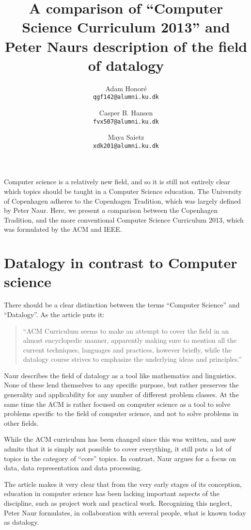 \documentclass[11pt,a4paper]{article}
\title{A comparison of “Computer Science Curriculum 2013” and Peter Naurs description of the field of datalogy}
\author
{
	Adam Honoré\\
	{\tt qgf142@alumni.ku.dk}
	\and
	Casper B. Hansen\\
	{\tt fvx507@alumni.ku.dk}
	\and
	Maya Saietz\\
	{\tt xdk201@alumni.ku.dk}
}
\begin{document}
\maketitle

\noindent Computer science is a relatively new field, and so it is still not entirely clear which topics should be taught in a
Computer Science education. The University of Copenhagen adheres to the Copenhagen Tradition, which was largely defined
by Peter Naur. Here, we present a comparison between the Copenhagen Tradition, and the more conventional Computer
Science Curriculum 2013, which was formulated by the ACM and IEEE.

\section{Datalogy in contrast to Computer science}
There should be a clear distinction between the terms ``Computer Science'' and ``Datalogy''. As the article\cite{froekjaer88} puts it:

\begin{quote}
    ``ACM Curriculum seems to make an attempt to cover the field in an almost encyclopedic manner, apparently making sure to
    mention all the current techniques, languages and practices, however briefly, while the datalogy course strives to
    emphasize the underlying ideas and principles.''
\end{quote}

Naur describes the field of datalogy as a tool like mathematics and linguistics. None of these lend themselves to any
specific purpose, but rather preserves the generality and applicability for any number of different problem classes. At
the same time the ACM is rather focused on computer science as a tool to solve problems specific to the field of
computer science, and not to solve problems in other fields.

While the ACM curriculum has been changed since this was written, and now admits that it is simply not possible to cover
everything, it still puts a lot of topics in the category of ``core'' topics. In contrast, Naur argues for a focus on
data, data representation and data processing\cite{naur66}.

The article\cite{froekjaer88} makes it very clear that from the very early stages of its conception, education in computer science has
been lacking important aspects of the discipline, such as project work and practical work. Recognizing this neglect,
Peter Naur formulates, in collaboration with several people, what is known today as datalogy.
\end{document}
